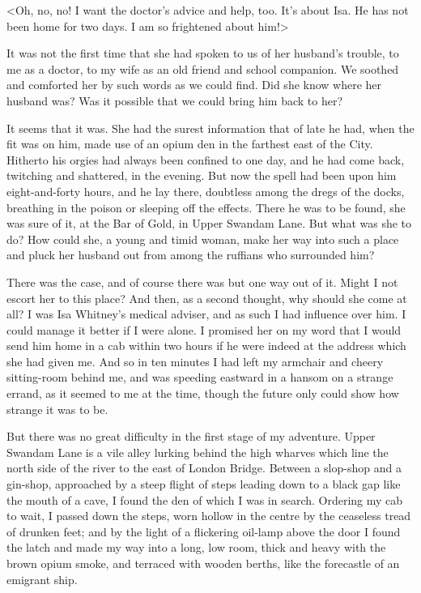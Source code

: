 <Oh, no, no! I want the doctor's advice and help, too. It's about Isa. He has not been home for two days. I am so frightened about him!>

It was not the first time that she had spoken to us of her husband's trouble, to me as a doctor, to my wife as an old friend and school companion. We soothed and comforted her by such words as we could find. Did she know where her husband was? Was it possible that we could bring him back to her?

It seems that it was. She had the surest information that of late he had, when the fit was on him, made use of an opium den in the farthest east of the City. Hitherto his orgies had always been confined to one day, and he had come back, twitching and shattered, in the evening. But now the spell had been upon him eight-and-forty hours, and he lay there, doubtless among the dregs of the docks, breathing in the poison or sleeping off the effects. There he was to be found, she was sure of it, at the Bar of Gold, in Upper Swandam Lane. But what was she to do? How could she, a young and timid woman, make her way into such a place and pluck her husband out from among the ruffians who surrounded him?

There was the case, and of course there was but one way out of it. Might I not escort her to this place? And then, as a second thought, why should she come at all? I was Isa Whitney's medical adviser, and as such I had influence over him. I could manage it better if I were alone. I promised her on my word that I would send him home in a cab within two hours if he were indeed at the address which she had given me. And so in ten minutes I had left my armchair and cheery sitting-room behind me, and was speeding eastward in a hansom on a strange errand, as it seemed to me at the time, though the future only could show how strange it was to be.

But there was no great difficulty in the first stage of my adventure. Upper Swandam Lane is a vile alley lurking behind the high wharves which line the north side of the river to the east of London Bridge. Between a slop-shop and a gin-shop, approached by a steep flight of steps leading down to a black gap like the mouth of a cave, I found the den of which I was in search. Ordering my cab to wait, I passed down the steps, worn hollow in the centre by the ceaseless tread of drunken feet; and by the light of a flickering oil-lamp above the door I found the latch and made my way into a long, low room, thick and heavy with the brown opium smoke, and terraced with wooden berths, like the forecastle of an emigrant ship.

